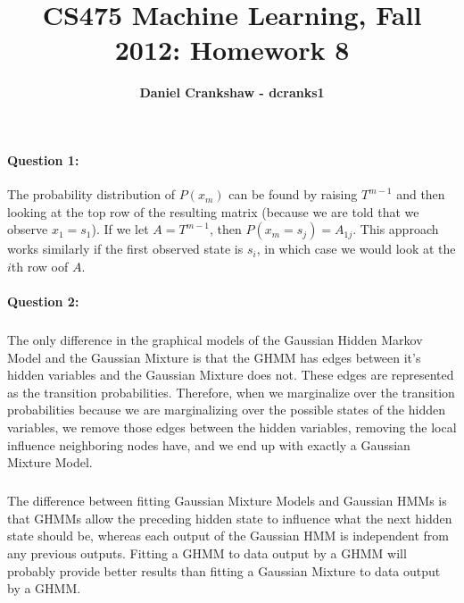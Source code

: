 \documentclass[letterpaper,11pt]{article}
\title{CS475 Machine Learning, Fall 2012: Homework 8}
\date{}
\author{\bf Daniel Crankshaw - dcranks1}
\begin{document}
\maketitle

\paragraph{Question 1:}
The probability distribution of $P(x_m)$ can be found by raising $T^{m-1}$ and then looking
at the top row of the resulting matrix (because we are told that we observe $x_1 = s_1$).
If we let $A = T^{m-1}$, then $P(x_m = s_j) = A_{1j}$. This approach works similarly if the
first observed state is $s_i$, in which case we would look at the $i$th row oof $A$.

\paragraph{Question 2:}
\subparagraph{}
The only difference in the graphical models of the Gaussian Hidden Markov Model and the
Gaussian Mixture is that the GHMM has edges between it's hidden variables and the
Gaussian Mixture does not. These edges are represented as the transition probabilities.
Therefore, when we marginalize over the transition probabilities because we are marginalizing
over the possible states of the hidden variables, we remove those edges between the hidden
variables, removing the local influence neighboring nodes have, and we end up with exactly
a Gaussian Mixture Model.

\subparagraph{}
The difference between fitting Gaussian Mixture Models and Gaussian HMMs is that
GHMMs allow the preceding hidden state to influence what the next hidden state should
be, whereas each output of the Gaussian HMM is independent from any previous outputs.
Fitting a GHMM to data output by a GHMM will probably provide better results than
fitting a Gaussian Mixture to data output by a GHMM.
\end{document}
